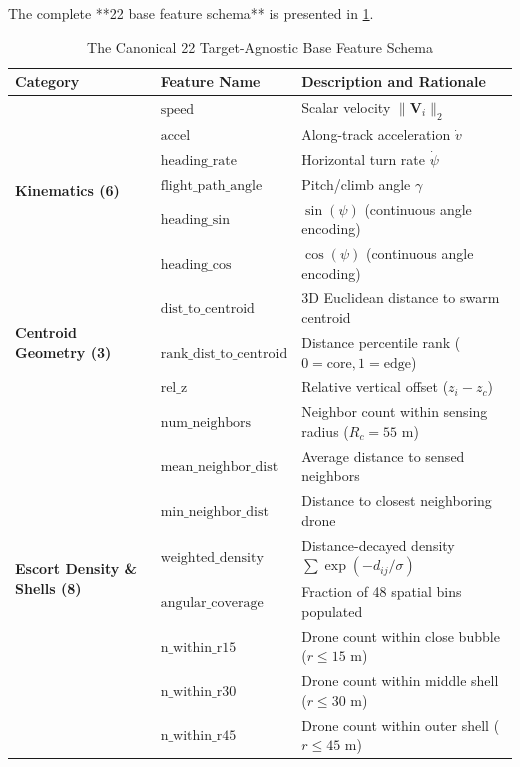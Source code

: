 \documentclass[9pt]{ieeeconf}
\begin{document}
The complete **22 base feature schema** is presented in \cref{tab:feature_schema}.

\begin{table}[h]
\centering
\caption{The Canonical 22 Target-Agnostic Base Feature Schema}
\label{tab:feature_schema}
\scriptsize
\begin{tabularx}{\columnwidth}{l l X}
\toprule
\textbf{Category} & \textbf{Feature Name} & \textbf{Description and Rationale} \\
\midrule
\multirow{6}{*}{\textbf{Kinematics (6)}} 
& $\text{speed}$ & Scalar velocity $\|\mathbf{V}_i\|_2$ \\
& $\text{accel}$ & Along-track acceleration $\dot{v}$ \\
& $\text{heading\_rate}$ & Horizontal turn rate $\dot{\psi}$ \\
& $\text{flight\_path\_angle}$ & Pitch/climb angle $\gamma$ \\
& $\text{heading\_sin}$ & $\sin(\psi)$ (continuous angle encoding) \\
& $\text{heading\_cos}$ & $\cos(\psi)$ (continuous angle encoding) \\
\midrule
\multirow{3}{*}{\textbf{Centroid Geometry (3)}} 
& $\text{dist\_to\_centroid}$ & 3D Euclidean distance to swarm centroid \\
& $\text{rank\_dist\_to\_centroid}$ & Distance percentile rank ($0=\text{core}, 1=\text{edge}$) \\
& $\text{rel\_z}$ & Relative vertical offset ($z_i - z_c$) \\
\midrule
\multirow{8}{*}{\textbf{Escort Density \& Shells (8)}} 
& $\text{num\_neighbors}$ & Neighbor count within sensing radius ($R_c = 55\text{ m}$) \\
& $\text{mean\_neighbor\_dist}$ & Average distance to sensed neighbors \\
& $\text{min\_neighbor\_dist}$ & Distance to closest neighboring drone \\
& $\text{weighted\_density}$ & Distance-decayed density $\sum \exp(-d_{ij}/\sigma)$ \\
& $\text{angular\_coverage}$ & Fraction of 48 spatial bins populated \\
& $\text{n\_within\_r15}$ & Drone count within close bubble ($r \le 15\text{ m}$) \\
& $\text{n\_within\_r30}$ & Drone count within middle shell ($r \le 30\text{ m}$) \\
& $\text{n\_within\_r45}$ & Drone count within outer shell ($r \le 45\text{ m}$) \\

\end{tabularx}
\end{table}
\end{document}
